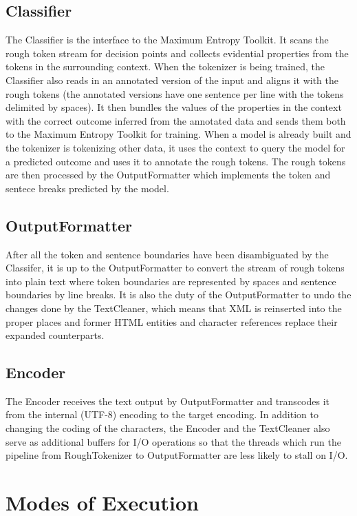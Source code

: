 \subsection{Classifier}

The Classifier is the interface to the Maximum Entropy Toolkit. It scans the
rough token stream for decision points and collects evidential properties from
the tokens in the surrounding context. When the tokenizer is being trained, the
Classifier also reads in an annotated version of the input and aligns it with
the rough tokens (the annotated versions have one sentence per line with the
tokens delimited by spaces). It then bundles the values of the properties in
the context with the correct outcome inferred from the annotated data and sends
them both to the Maximum Entropy Toolkit for training. When a model is already
built and the tokenizer is tokenizing other data, it uses the context to query
the model for a predicted outcome and uses it to annotate the rough tokens. The
rough tokens are then processed by the OutputFormatter which implements the
token and sentece breaks predicted by the model.

\subsection{OutputFormatter}

After all the token and sentence boundaries have been disambiguated by the
Classifer, it is up to the OutputFormatter to convert the stream of rough
tokens into plain text where token boundaries are represented by spaces and
sentence boundaries by line breaks. It is also the duty of the OutputFormatter
to undo the changes done by the TextCleaner, which means that XML is reinserted
into the proper places and former HTML entities and character references
replace their expanded counterparts.

\subsection{Encoder}

The Encoder receives the text output by OutputFormatter and transcodes it from
the internal (UTF-8) encoding to the target encoding. In addition to changing
the coding of the characters, the Encoder and the TextCleaner also serve as
additional buffers for I/O operations so that the threads which run the
pipeline from RoughTokenizer to OutputFormatter are less likely to stall on
I/O.


\section{Modes of Execution}
\label{sec:impl-modes}

